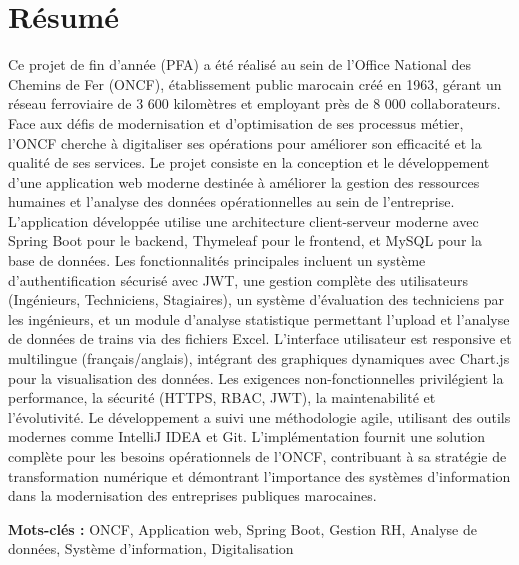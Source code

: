 \chapter*{Résumé}

\begin{justify}

Ce projet de fin d'année (PFA) a été réalisé au sein de l'Office National des Chemins de Fer (ONCF), établissement public marocain créé en 1963, gérant un réseau ferroviaire de 3 600 kilomètres et employant près de 8 000 collaborateurs. Face aux défis de modernisation et d'optimisation de ses processus métier, l'ONCF cherche à digitaliser ses opérations pour améliorer son efficacité et la qualité de ses services. Le projet consiste en la conception et le développement d'une application web moderne destinée à améliorer la gestion des ressources humaines et l'analyse des données opérationnelles au sein de l'entreprise. L'application développée utilise une architecture client-serveur moderne avec Spring Boot pour le backend, Thymeleaf pour le frontend, et MySQL pour la base de données. Les fonctionnalités principales incluent un système d'authentification sécurisé avec JWT, une gestion complète des utilisateurs (Ingénieurs, Techniciens, Stagiaires), un système d'évaluation des techniciens par les ingénieurs, et un module d'analyse statistique permettant l'upload et l'analyse de données de trains via des fichiers Excel. L'interface utilisateur est responsive et multilingue (français/anglais), intégrant des graphiques dynamiques avec Chart.js pour la visualisation des données. Les exigences non-fonctionnelles privilégient la performance, la sécurité (HTTPS, RBAC, JWT), la maintenabilité et l'évolutivité. Le développement a suivi une méthodologie agile, utilisant des outils modernes comme IntelliJ IDEA et Git. L'implémentation fournit une solution complète pour les besoins opérationnels de l'ONCF, contribuant à sa stratégie de transformation numérique et démontrant l'importance des systèmes d'information dans la modernisation des entreprises publiques marocaines.

\end{justify}

\textbf{Mots-clés :} ONCF, Application web, Spring Boot, Gestion RH, Analyse de données, Système d'information, Digitalisation

\vfill

\newpage